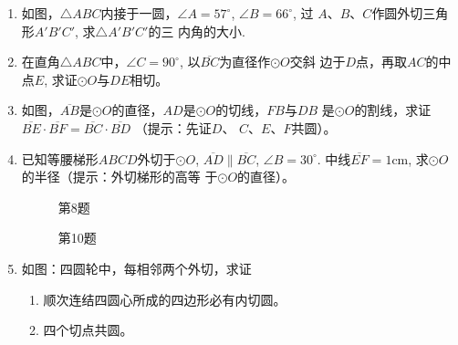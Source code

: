 \begin{enumerate}
  \item 如图，$\triangle ABC$内接于一圆，$\angle A=57^{\circ}$, $\angle B=66^{\circ}$, 过
$A$、$B$、$C$作圆外切三角形$A'B'C'$, 求$\triangle A'B'C'$的三
内角的大小.
\item 在直角$\triangle ABC$中，$\angle C=90^{\circ}$, 以$\overline{BC}$为直径作$\odot O$交斜
边于$D$点，再取$AC$的中点$E$, 求证$\odot O$与$DE$相切。
\item 如图，$\overline{AB}$是$\odot O$的直径，$AD$是$\odot O$的切线，$FB$与$DB$
是$\odot O$的割线，求证
$\overline{BE}\cdot \overline{BF}=\overline{BC}\cdot\overline{BD}$ （提示：先证$D$、
$C$、$E$、$F$共圆）。
\item 已知等腰梯形$ABCD$外切于$\odot O$, $\overline{AD}\parallel \overline{BC}$, $\angle B=30^{\circ}$. 
中线$\overline{EF}=1$cm, 求$\odot O$的半径（提示：外切梯形的高等
于$\odot O$的直径）。

\begin{figure}[htp]\centering
  \begin{minipage}[t]{0.48\textwidth}
  \centering
{}
  \caption*{第8题}
  \end{minipage}
  \begin{minipage}[t]{0.48\textwidth}
  \centering
  \caption*{第10题}
  \end{minipage}
  \end{figure}

  \item  如图：四圆轮中，每相邻两个外切，求证
\begin{enumerate}
  \item 顺次连结四圆心所成的四边形必有内切圆。
  \item 四个切点共圆。
\end{enumerate}


\end{enumerate}

